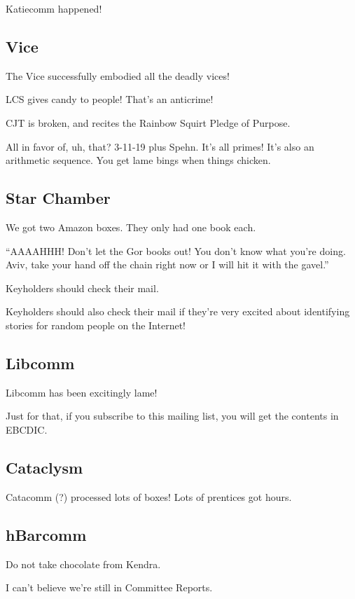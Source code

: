 \documentclass[10pt]{article}
\newcommand{\ps}{ plus Spehn\xspace}
\begin{document}
Katiecomm happened!

\subsection*{Vice}

The Vice successfully embodied all the deadly vices!

LCS gives candy to people!  That's an anticrime!

CJT is broken, and recites the Rainbow Squirt Pledge of Purpose.

All in favor of, uh, that?  3-11-19\ps.  It's all primes!  It's also
an arithmetic sequence.  You get lame bings when things chicken.

\subsection*{Star Chamber}

We got two Amazon boxes.  They only had one book each.

``AAAAHHH!  Don't let the Gor books out!  You don't know what you're
doing.  Aviv, take your hand off the chain right now or I will hit it
with the gavel.''

Keyholders should check their mail.

Keyholders should also check their mail if they're very excited about
identifying stories for random people on the Internet!

\subsection*{Libcomm}

Libcomm has been excitingly lame!

Just for that, if you subscribe to this mailing list, you will get the
contents in EBCDIC.

\subsection*{Cataclysm}

Catacomm (?) processed lots of boxes!  Lots of prentices got hours.

\subsection*{hBarcomm}

Do not take chocolate from Kendra.

I can't believe we're still in Committee Reports.
\end{document}
